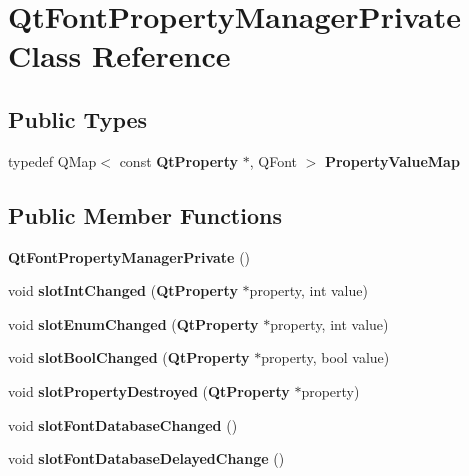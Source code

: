 \section{Qt\+Font\+Property\+Manager\+Private Class Reference}
\label{classQtFontPropertyManagerPrivate}
\subsection*{Public Types}
\begin{DoxyCompactItemize}
\item 
typedef Q\+Map$<$ const {\bf Qt\+Property} $\ast$, Q\+Font $>$ {\bf Property\+Value\+Map}
\end{DoxyCompactItemize}
\subsection*{Public Member Functions}
\begin{DoxyCompactItemize}
\item 
{\bf Qt\+Font\+Property\+Manager\+Private} ()
\item 
void {\bf slot\+Int\+Changed} ({\bf Qt\+Property} $\ast$property, int value)
\item 
void {\bf slot\+Enum\+Changed} ({\bf Qt\+Property} $\ast$property, int value)
\item 
void {\bf slot\+Bool\+Changed} ({\bf Qt\+Property} $\ast$property, bool value)
\item 
void {\bf slot\+Property\+Destroyed} ({\bf Qt\+Property} $\ast$property)
\item 
void {\bf slot\+Font\+Database\+Changed} ()
\item 
void {\bf slot\+Font\+Database\+Delayed\+Change} ()
\end{DoxyCompactItemize}
